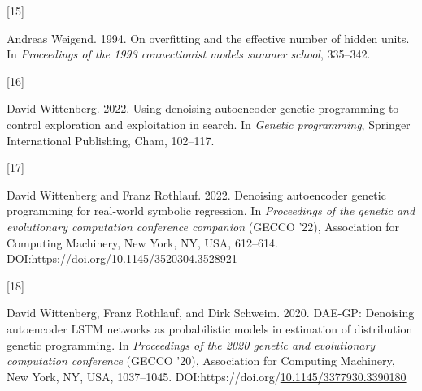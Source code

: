 \documentclass[
  11pt,
]{article}
\newlength{\cslhangindent}
\newlength{\csllabelwidth}
\newlength{\cslentryspacingunit} %
\newenvironment{CSLReferences}[2] %
 {%
  \setlength{\parindent}{0pt}
  \ifodd #1
  \let\oldpar\par
  \def\par{\hangindent=\cslhangindent\oldpar}
  \fi
  \setlength{\parskip}{#2\cslentryspacingunit}
 }%
 {}
\newcommand{\CSLLeftMargin}[1]{\parbox[t]{\csllabelwidth}{#1}}
\newcommand{\CSLRightInline}[1]{\parbox[t]{\linewidth - \csllabelwidth}{#1}\break}
\begin{document}
\begin{CSLReferences}{0}{0}
\leavevmode{}%
\CSLLeftMargin{{[}15{]} }%
\CSLRightInline{Andreas Weigend. 1994. On overfitting and the effective number of hidden units. In \emph{Proceedings of the 1993 connectionist models summer school}, 335--342.}

\leavevmode{}%
\CSLLeftMargin{{[}16{]} }%
\CSLRightInline{David Wittenberg. 2022. Using denoising autoencoder genetic programming to control exploration and exploitation in search. In \emph{Genetic programming}, Springer International Publishing, Cham, 102--117.}

\leavevmode{}%
\CSLLeftMargin{{[}17{]} }%
\CSLRightInline{David Wittenberg and Franz Rothlauf. 2022. Denoising autoencoder genetic programming for real-world symbolic regression. In \emph{Proceedings of the genetic and evolutionary computation conference companion} (GECCO '22), Association for Computing Machinery, New York, NY, USA, 612--614. DOI:https://doi.org/\href{https://doi.org/10.1145/3520304.3528921}{10.1145/3520304.3528921}}

\leavevmode{}%
\CSLLeftMargin{{[}18{]} }%
\CSLRightInline{David Wittenberg, Franz Rothlauf, and Dirk Schweim. 2020. DAE-GP: Denoising autoencoder LSTM networks as probabilistic models in estimation of distribution genetic programming. In \emph{Proceedings of the 2020 genetic and evolutionary computation conference} (GECCO '20), Association for Computing Machinery, New York, NY, USA, 1037--1045. DOI:https://doi.org/\href{https://doi.org/10.1145/3377930.3390180}{10.1145/3377930.3390180}}

\end{CSLReferences}
\end{document}
